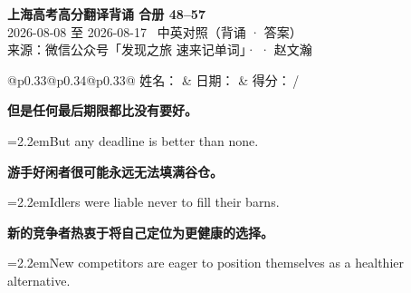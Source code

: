\documentclass[11pt,a4paper]{article}
\newcommand{\num}[1]{\makebox[1.9em][r]{#1.}\hspace{0.3em}}
\begin{document}
\pagestyle{plain}
\begin{center}
{\LARGE\bfseries 上海高考高分翻译背诵 \quad 合册 48–57}\\[0.25em]
{\large 2026-08-08 至 2026-08-17 \quad\ 中英对照（背诵 · 答案）}\\[0.35em]
{\footnotesize 来源：微信公众号「发现之旅 速来记单词」·  · 赵文瀚}
\end{center}

\vspace{0.4em}
\noindent\begin{tabular}{@{}p{0.33\textwidth}@{}p{0.34\textwidth}@{}p{0.33\textwidth}@{}}
姓名：\underline{\hspace{2.0cm}} & 日期：\underline{\hspace{2.0cm}} & 得分：\underline{\hspace{1.4cm}}\,/ \\
\end{tabular}

\vspace{0.5em}

\vspace{0.8em}
\vspace{0.35em}\vspace{0.15em}

\begin{minipage}{\linewidth}

\num{1}\textbf{但是任何最后期限都比没有要好。}

\vspace{0.15em}

\noindent\hangindent=2.2em\hspace{2.2em}But any deadline is better than none.

\end{minipage}

\begin{minipage}{\linewidth}

\num{2}\textbf{游手好闲者很可能永远无法填满谷仓。}

\vspace{0.15em}

\noindent\hangindent=2.2em\hspace{2.2em}Idlers were liable never to fill their barns.

\end{minipage}

\begin{minipage}{\linewidth}

\num{3}\textbf{新的竞争者热衷于将自己定位为更健康的选择。}

\vspace{0.15em}

\noindent\hangindent=2.2em\hspace{2.2em}New competitors are eager to position themselves as a healthier alternative.

\end{minipage}
\end{document}
